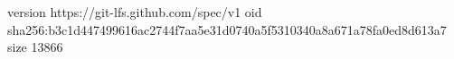 version https://git-lfs.github.com/spec/v1
oid sha256:b3c1d447499616ac2744f7aa5e31d0740a5f5310340a8a671a78fa0ed8d613a7
size 13866
